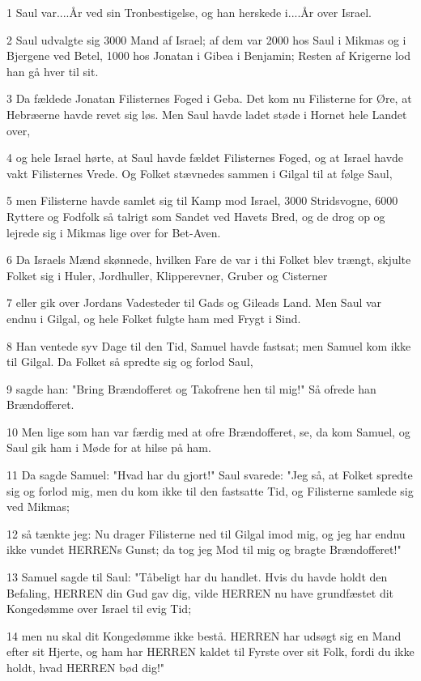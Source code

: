 \par 1 Saul var....År ved sin Tronbestigelse, og han herskede i....År over Israel.
\par 2 Saul udvalgte sig 3000 Mand af Israel; af dem var 2000 hos Saul i Mikmas og i Bjergene ved Betel, 1000 hos Jonatan i Gibea i Benjamin; Resten af Krigerne lod han gå hver til sit.
\par 3 Da fældede Jonatan Filisternes Foged i Geba. Det kom nu Filisterne for Øre, at Hebræerne havde revet sig løs. Men Saul havde ladet støde i Hornet hele Landet over,
\par 4 og hele Israel hørte, at Saul havde fældet Filisternes Foged, og at Israel havde vakt Filisternes Vrede. Og Folket stævnedes sammen i Gilgal til at følge Saul,
\par 5 men Filisterne havde samlet sig til Kamp mod Israel, 3000 Stridsvogne, 6000 Ryttere og Fodfolk så talrigt som Sandet ved Havets Bred, og de drog op og lejrede sig i Mikmas lige over for Bet-Aven.
\par 6 Da Israels Mænd skønnede, hvilken Fare de var i thi Folket blev trængt, skjulte Folket sig i Huler, Jordhuller, Klipperevner, Gruber og Cisterner
\par 7 eller gik over Jordans Vadesteder til Gads og Gileads Land. Men Saul var endnu i Gilgal, og hele Folket fulgte ham med Frygt i Sind.
\par 8 Han ventede syv Dage til den Tid, Samuel havde fastsat; men Samuel kom ikke til Gilgal. Da Folket så spredte sig og forlod Saul,
\par 9 sagde han: "Bring Brændofferet og Takofrene hen til mig!" Så ofrede han Brændofferet.
\par 10 Men lige som han var færdig med at ofre Brændofferet, se, da kom Samuel, og Saul gik ham i Møde for at hilse på ham.
\par 11 Da sagde Samuel: "Hvad har du gjort!" Saul svarede: "Jeg så, at Folket spredte sig og forlod mig, men du kom ikke til den fastsatte Tid, og Filisterne samlede sig ved Mikmas;
\par 12 så tænkte jeg: Nu drager Filisterne ned til Gilgal imod mig, og jeg har endnu ikke vundet HERRENs Gunst; da tog jeg Mod til mig og bragte Brændofferet!"
\par 13 Samuel sagde til Saul: "Tåbeligt har du handlet. Hvis du havde holdt den Befaling, HERREN din Gud gav dig, vilde HERREN nu have grundfæstet dit Kongedømme over Israel til evig Tid;
\par 14 men nu skal dit Kongedømme ikke bestå. HERREN har udsøgt sig en Mand efter sit Hjerte, og ham har HERREN kaldet til Fyrste over sit Folk, fordi du ikke holdt, hvad HERREN bød dig!"
